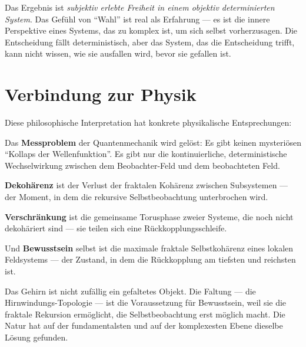 Das Ergebnis ist \emph{subjektiv erlebte Freiheit in einem objektiv determinierten System}. Das Gefühl von \enquote{Wahl} ist real als Erfahrung --- es ist die innere Perspektive eines Systems, das zu komplex ist, um sich selbst vorherzusagen. Die Entscheidung fällt deterministisch, aber das System, das die Entscheidung trifft, kann nicht wissen, wie sie ausfallen wird, bevor sie gefallen ist.

\section{Verbindung zur Physik}

Diese philosophische Interpretation hat konkrete physikalische Entsprechungen:

Das \textbf{Messproblem} der Quantenmechanik wird gelöst: Es gibt keinen mysteriösen \enquote{Kollaps der Wellenfunktion}. Es gibt nur die kontinuierliche, deterministische Wechselwirkung zwischen dem Beobachter-Feld und dem beobachteten Feld.

\textbf{Dekohärenz} ist der Verlust der fraktalen Kohärenz zwischen Subsystemen --- der Moment, in dem die rekursive Selbstbeobachtung unterbrochen wird.

\textbf{Verschränkung} ist die gemeinsame Torusphase zweier Systeme, die noch nicht dekohäriert sind --- sie teilen sich eine Rückkopplungsschleife.

Und \textbf{Bewusstsein} selbst ist die maximale fraktale Selbstkohärenz eines lokalen Feldsystems --- der Zustand, in dem die Rückkopplung am tiefsten und reichsten ist.

\begin{kerngedanke}
Das Gehirn ist nicht zufällig ein gefaltetes Objekt. Die Faltung --- die Hirnwindungs-Topologie --- ist die Voraussetzung für Bewusstsein, weil sie die fraktale Rekursion ermöglicht, die Selbstbeobachtung erst möglich macht. Die Natur hat auf der fundamentalsten und auf der komplexesten Ebene dieselbe Lösung gefunden.
\end{kerngedanke}
